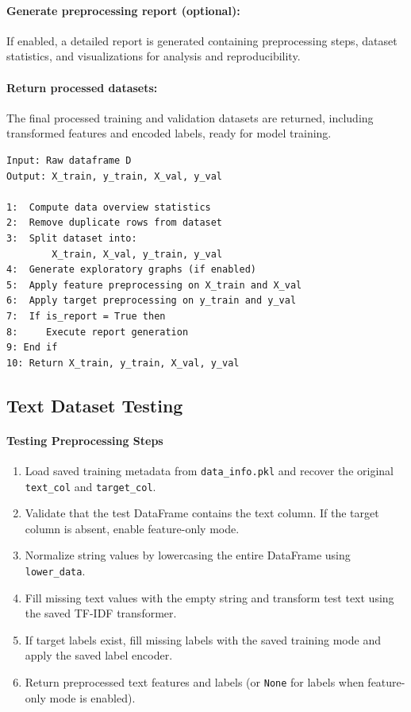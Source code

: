 \paragraph{Generate preprocessing report (optional):}\par
If enabled, a detailed report is generated containing preprocessing steps, dataset statistics, and visualizations for analysis and reproducibility.
\vspace{1cm}
\paragraph{Return processed datasets:}\par
The final processed training and validation datasets are returned, including transformed features and encoded labels, ready for model training.
\vspace{2cm}
\begin{lstlisting}[style=algostyle,caption={Common Preprocessing Pipeline},label={alg:common_preprocessing}]
Input: Raw dataframe D
Output: X_train, y_train, X_val, y_val

1:  Compute data overview statistics
2:  Remove duplicate rows from dataset
3:  Split dataset into:
        X_train, X_val, y_train, y_val
4:  Generate exploratory graphs (if enabled)
5:  Apply feature preprocessing on X_train and X_val
6:  Apply target preprocessing on y_train and y_val
7:  If is_report = True then
8:     Execute report generation
9: End if
10: Return X_train, y_train, X_val, y_val
\end{lstlisting}
\subsection{Text Dataset Testing}

\vspace{1cm}
\paragraph{Testing Preprocessing Steps}\par

\begin{enumerate}
  \item Load saved training metadata from \texttt{data\_info.pkl} and recover the original \texttt{text\_col} and \texttt{target\_col}.
  \item Validate that the test DataFrame contains the text column. If the target column is absent, enable feature-only mode.
  \item Normalize string values by lowercasing the entire DataFrame using \texttt{lower\_data}. 
  \item Fill missing text values with the empty string and transform test text using the saved TF-IDF transformer.
  \item If target labels exist, fill missing labels with the saved training mode and apply the saved label encoder.
  \item Return preprocessed text features and labels (or \texttt{None} for labels when feature-only mode is enabled).
\end{enumerate}
\vspace{1cm}
